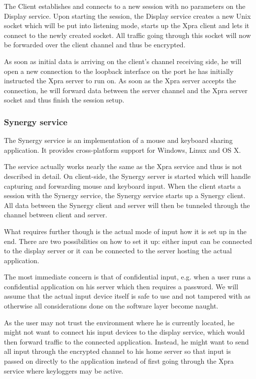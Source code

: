 The Client establishes and connects to a new session with no parameters on the Display service.
Upon starting the session, the Display service creates a new Unix socket which will be put into listening mode, starts up the Xpra client and lets it connect to the newly created socket.
All traffic going through this socket will now be forwarded over the client channel and thus be encrypted.

As soon as initial data is arriving on the client's channel receiving side, he will open a new connection to the loopback interface on the port he has initially instructed the Xpra server to run on.
As soon as the Xpra server accepts the connection, he will forward data between the server channel and the Xpra server socket and thus finish the session setup.

\subsubsection{Synergy service}
\label{sec:synergy-service}

The Synergy service is an implementation of a mouse and keyboard sharing application.
It provides cross-platform support for Windows, Linux and OS X.

The service actually works nearly the same as the Xpra service and thus is not described in detail.
On client-side, the Synergy server is started which will handle capturing and forwarding mouse and keyboard input.
When the client starts a session with the Synergy service, the Synergy service starts up a Synergy client.
All data between the Synergy client and server will then be tunneled through the channel between client and server.

\medskip

What requires further though is the actual mode of input how it is set up in the end.
There are two possibilities on how to set it up: either input can be connected to the display server or it can be connected to the server hosting the actual application.

The most immediate concern is that of confidential input, e.g. when a user runs a confidential application on his server which then requires a password.
We will assume that the actual input device itself is safe to use and not tampered with as otherwise all considerations done on the software layer become naught.

As the user may not trust the environment where he is currently located, he might not want to connect his input devices to the display service, which would then forward traffic to the connected application.
Instead, he might want to send all input through the encrypted channel to his home server so that input is passed on directly to the application instead of first going through the Xpra service where keyloggers may be active.

